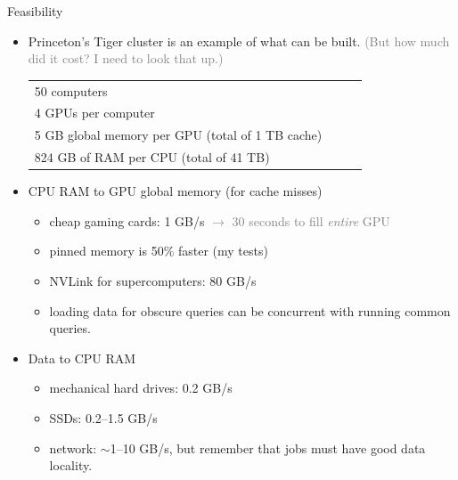 \documentclass{beamer}
\begin{document}
\begin{frame}{Feasibility}
\vspace{0.25 cm}
\begin{itemize}
\item Princeton's Tiger cluster is an example of what can be built. \textcolor{gray}{\small (But how much did it cost? I need to look that up.)}

\small
\hfill \begin{tabular}{p{0.9\linewidth}}
50 computers \\
4 GPUs per computer \\
5 GB global memory per GPU (total of 1 TB cache) \\
824 GB of RAM per CPU (total of 41 TB)
\end{tabular}

\normalsize
\item<2-> CPU RAM to GPU global memory (for cache misses)
\begin{itemize}
\item cheap gaming cards: 1 GB/s \textcolor{gray}{$\to$ 30 seconds to fill {\it entire} GPU}
\item pinned memory is 50\% faster (my tests)
\item NVLink for supercomputers: 80 GB/s
\item loading data for obscure queries can be concurrent with running common queries.
\end{itemize}

\item<3-> Data to CPU RAM
\begin{itemize}
\item mechanical hard drives: 0.2 GB/s
\item SSDs: 0.2--1.5 GB/s
\item network: $\sim$1--10 GB/s, but remember that jobs must have good data locality.
\end{itemize}

\end{itemize}
\end{frame}
\end{document}
